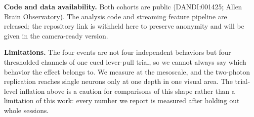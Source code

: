 \documentclass[mlabstract,onecolumn]{jmlr}
\begin{document}
\textbf{Code and data availability.} Both cohorts are public (DANDI:001425; Allen Brain
Observatory). The analysis code and streaming feature pipeline are released; the repository link is
withheld here to preserve anonymity and will be given in the camera-ready version.

\textbf{Limitations.} The four events are not four independent behaviors but four thresholded
channels of one cued lever-pull trial, so we cannot always say which behavior the effect belongs to.
We measure at the mesoscale, and the two-photon replication reaches single neurons only at one depth
in one visual area. The trial-level inflation above is a caution for comparisons of this shape
rather than a limitation of this work: every number we report is measured after holding out whole
sessions.
\end{document}
